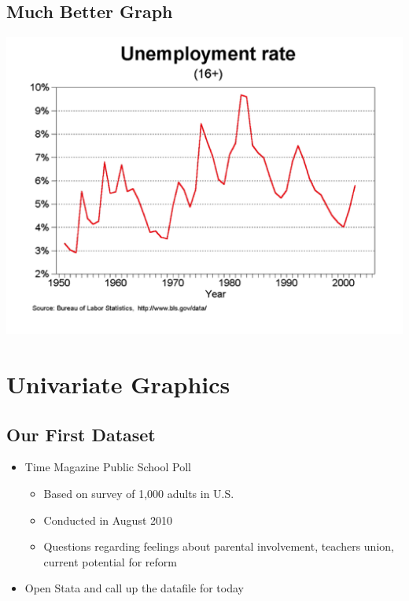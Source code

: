 \documentclass[]{book}
\providecommand{\tightlist}{%
  \setlength{\itemsep}{0pt}\setlength{\parskip}{0pt}}
\begin{document}
\hypertarget{much-better-graph}{%
\subsection{Much Better Graph}\label{much-better-graph}}

\includegraphics{Stata/StataModGraph/images/Good.png}

\hypertarget{univariate-graphics}{%
\section{Univariate Graphics}\label{univariate-graphics}}

\hypertarget{our-first-dataset}{%
\subsection{Our First Dataset}\label{our-first-dataset}}

\begin{itemize}
\tightlist
\item
  Time Magazine Public School Poll

  \begin{itemize}
  \tightlist
  \item
    Based on survey of 1,000 adults in U.S.
  \item
    Conducted in August 2010
  \item
    Questions regarding feelings about parental involvement, teachers union, current potential for reform
  \end{itemize}
\item
  Open Stata and call up the datafile for today
\end{itemize}
\end{document}
